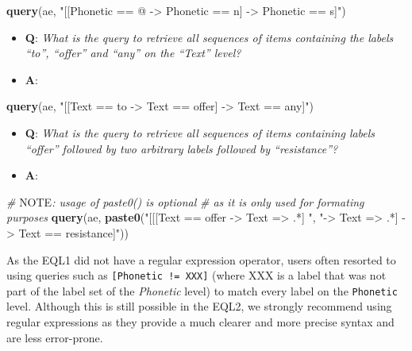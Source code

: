\documentclass[]{book}
\newenvironment{Shaded}{\begin{snugshade}}{\end{snugshade}}
\newcommand{\AlertTok}[1]{\textcolor[rgb]{0.94,0.16,0.16}{#1}}
\newcommand{\CommentTok}[1]{\textcolor[rgb]{0.56,0.35,0.01}{\textit{#1}}}
\newcommand{\KeywordTok}[1]{\textcolor[rgb]{0.13,0.29,0.53}{\textbf{#1}}}
\newcommand{\NormalTok}[1]{#1}
\newcommand{\StringTok}[1]{\textcolor[rgb]{0.31,0.60,0.02}{#1}}
\providecommand{\tightlist}{%
  \setlength{\itemsep}{0pt}\setlength{\parskip}{0pt}}
\begin{document}
\begin{Shaded}
\begin{Highlighting}[]
\KeywordTok{query}\NormalTok{(ae, }\StringTok{"[[Phonetic == @ -> Phonetic == n] -> Phonetic == s]"}\NormalTok{)}
\end{Highlighting}
\end{Shaded}

\begin{itemize}
\tightlist
\item
  \textbf{Q}: \emph{What is the query to retrieve all sequences of items containing the labels ``to'', ``offer'' and ``any'' on the ``Text'' level?}
\item
  \textbf{A}:
\end{itemize}

\begin{Shaded}
\begin{Highlighting}[]
\KeywordTok{query}\NormalTok{(ae, }\StringTok{"[[Text == to -> Text == offer] -> Text == any]"}\NormalTok{)}
\end{Highlighting}
\end{Shaded}

\begin{itemize}
\tightlist
\item
  \textbf{Q}: \emph{What is the query to retrieve all sequences of items containing labels ``offer'' followed by two arbitrary labels followed by ``resistance''?}
\item
  \textbf{A}:
\end{itemize}

\begin{Shaded}
\begin{Highlighting}[]
\CommentTok{# }\AlertTok{NOTE}\CommentTok{: usage of paste0() is optional}
\CommentTok{# as it is only used for formating purposes}
\KeywordTok{query}\NormalTok{(ae, }\KeywordTok{paste0}\NormalTok{(}\StringTok{"[[[Text == offer -> Text => .*] "}\NormalTok{,}
                 \StringTok{"-> Text => .*] -> Text == resistance]"}\NormalTok{))}
\end{Highlighting}
\end{Shaded}

As the EQL1 did not have a regular expression operator, users often resorted to using queries such as \texttt{{[}Phonetic\ !=\ XXX{]}} (where XXX is a label that was not part of the label set of the \emph{Phonetic} level) to match every label on the \texttt{Phonetic} level. Although this is still possible in the EQL2, we strongly recommend using regular expressions as they provide a much clearer and more precise syntax and are less error-prone.
\end{document}
